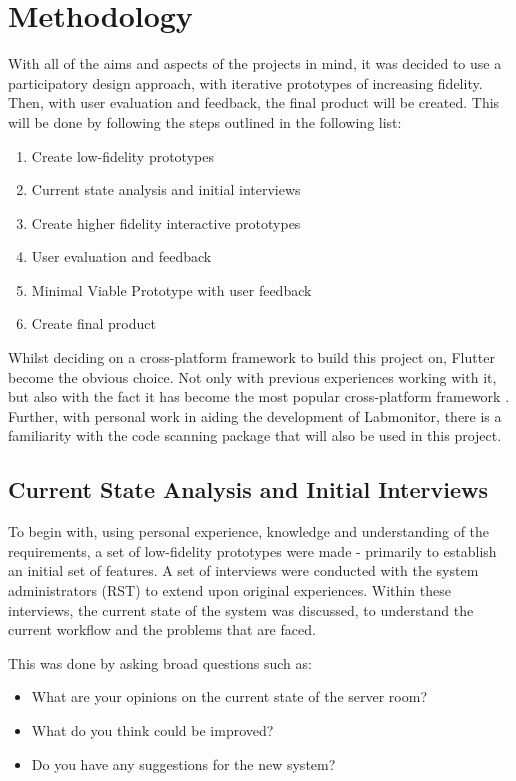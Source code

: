 \documentclass [11pt,a4paper]{article}
\begin{document}
\section{Methodology}
\label{sec:methodology}
With all of the aims and aspects of the projects in mind, it was decided to use a participatory design approach, with iterative prototypes of increasing fidelity. Then, with user evaluation and feedback, the final product will be created. This will be done by following the steps outlined in the following list:

\begin{enumerate}
    \item Create low-fidelity prototypes
    \item Current state analysis and initial interviews
    \item Create higher fidelity interactive prototypes
    \item User evaluation and feedback
    \item Minimal Viable Prototype with user feedback
    \item Create final product
\end{enumerate}

Whilst deciding on a cross-platform framework to build this project on, Flutter become the obvious choice. Not only with previous experiences working with it, but also with the fact it has become the most popular cross-platform framework \cite{JetBrainsFlutter}. Further, with personal work in aiding the development of Labmonitor\cite{labmonitor}, there is a familiarity with the code scanning package that will also be used in this project\cite{barcodeScannerPlugin}.

\subsection{Current State Analysis and Initial Interviews}
\label{sec:current_state_analysis}
To begin with, using personal experience, knowledge and  understanding of the requirements, a set of low-fidelity prototypes were made - primarily to establish an initial set of features. A set of interviews were conducted with the system administrators (RST) to extend upon original experiences.  Within these interviews, the current state of the system was discussed, to understand the current workflow and the problems that are faced.
\pagebreak

This was done by asking broad questions such as:

\begin{itemize}
    \item What are your opinions on the current state of the server room?
    \item What do you think could be improved?
    \item Do you have any suggestions for the new system?
\end{itemize}
\end{document}
